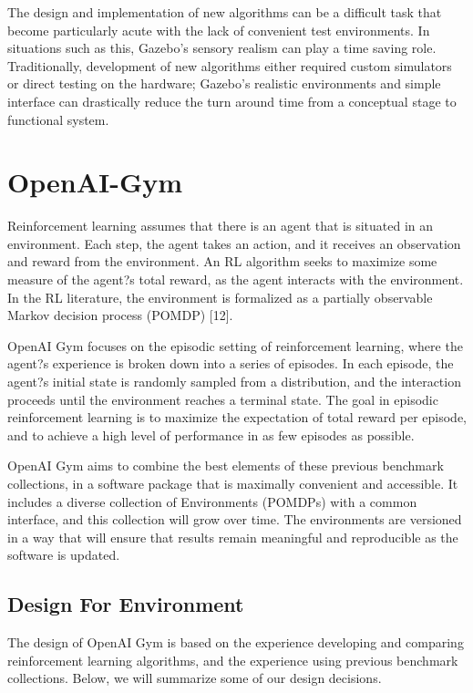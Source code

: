 The design and implementation of new algorithms can be a difficult task that become particularly acute with the lack of convenient test environments. In situations such as this, Gazebo's sensory realism can play a time saving role. Traditionally, development of new algorithms either required custom simulators or direct testing on the hardware; Gazebo's realistic environments and simple interface can drastically reduce the turn around time from a conceptual stage to functional system.

\section{OpenAI-Gym}

Reinforcement learning assumes that there is an agent that is situated in an environment. Each step, the agent takes an action, and it receives an observation and reward from the environment. An RL algorithm seeks to maximize some measure of the agent?s total reward, as the agent interacts with the environment. In the RL literature, the environment is formalized as a partially observable Markov decision process (POMDP) [12].

OpenAI Gym focuses on the episodic setting of reinforcement learning, where the agent?s experience is broken down into a series of episodes. In each episode, the agent?s initial state is randomly sampled from a distribution, and the interaction proceeds until the environment reaches a terminal state. The goal in episodic reinforcement learning is to maximize the expectation of total reward per episode, and to achieve a high level of performance in as few episodes as possible.

OpenAI Gym aims to combine the best elements of these previous benchmark collections, in a software package that is maximally convenient and accessible. It includes a diverse collection of Environments (POMDPs) with a common interface, and this collection will grow over time. The environments are versioned in a way that will ensure that results remain meaningful and reproducible as the software is updated.

\subsection{Design For Environment}

The design of OpenAI Gym is based on the experience developing and comparing reinforcement learning algorithms, and the experience using previous benchmark collections. Below, we will summarize some of our design decisions.

